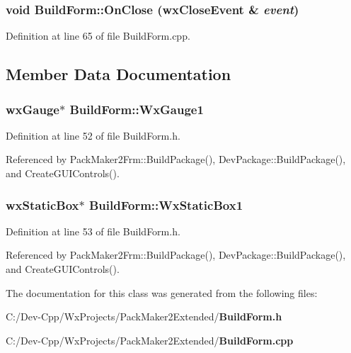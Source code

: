 \subsubsection{\setlength{\rightskip}{0pt plus 5cm}void Build\-Form::On\-Close (wx\-Close\-Event \& {\em event})\hspace{0.3cm}{\tt  [private]}}\label{class_build_form_5d166064d4e75d422d772dce3b1aefe4}




Definition at line 65 of file Build\-Form.cpp.

\subsection{Member Data Documentation}
\subsubsection{\setlength{\rightskip}{0pt plus 5cm}wx\-Gauge$\ast$ {\bf Build\-Form::Wx\-Gauge1}}\label{class_build_form_9c9de38ce27af15330f87971c4f65d35}




Definition at line 52 of file Build\-Form.h.

Referenced by Pack\-Maker2Frm::Build\-Package(), Dev\-Package::Build\-Package(), and Create\-GUIControls().
\subsubsection{\setlength{\rightskip}{0pt plus 5cm}wx\-Static\-Box$\ast$ {\bf Build\-Form::Wx\-Static\-Box1}}\label{class_build_form_8955d26ec5a1ec6e31df40178703d020}




Definition at line 53 of file Build\-Form.h.

Referenced by Pack\-Maker2Frm::Build\-Package(), Dev\-Package::Build\-Package(), and Create\-GUIControls().

The documentation for this class was generated from the following files:\begin{CompactItemize}
\item 
C:/Dev-Cpp/Wx\-Projects/Pack\-Maker2Extended/{\bf Build\-Form.h}\item 
C:/Dev-Cpp/Wx\-Projects/Pack\-Maker2Extended/{\bf Build\-Form.cpp}\end{CompactItemize}
